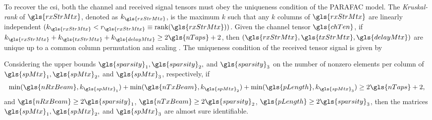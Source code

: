 \documentclass[conference]{IEEEtran}
\begin{document}
To recover the \gls{csi}, both the channel and
received signal tensors must obey the uniqueness condition of the
\gls{PARAFAC} model. The \textit{Kruskal-rank} of $\gls{rxStrMtx}$, denoted as
$k_{\gls{rxStrMtx}}$, is the maximum $k$ such that any $k$ columns of
$\gls{rxStrMtx}$ are linearly independent $(k_{\gls{rxStrMtx}} <
r_{\gls{rxStrMtx}} \equiv \textrm{rank}(\gls{rxStrMtx}) ) $. Given the channel
tensor $\gls{chTen}$, if
$k_{\gls{rxStrMtx}}+k_{\gls{txStrMtx}}+k_{\gls{delayMtx}} \geq 2\gls{nTaps} +
2$, then $(\gls{rxStrMtx},\gls{txStrMtx},\gls{delayMtx})$ are unique up to a
common column permutation and scaling \cite{Sidiropoulos:2000}. The uniqueness
condition of the received tensor signal is given by \cite{Sidiropoulos:2012}
\begin{theorem}
  \label{th.:compressed_parafac}
    Considering the upper bounds $\gls{sparsity}_1,\gls{sparsity}_2,$ and
    $\gls{sparsity}_3$ on the number of nonzero elements per column of
    $\gls{spMtx}_1, \gls{spMtx}_2,$ and $\gls{spMtx}_3$, respectively, if
    \begin{equation}
      \label{eq.uniqueness_compress_parafac}
      \min (\gls{nRxBeam},k_{\gls{spMtx}_1}) +\min (\gls{nTxBeam},k_{\gls{spMtx}_2}) + \min (\gls{pLength},k_{\gls{spMtx}_3}) \geq 2\gls{nTaps} + 2,
    \end{equation}
    and $\gls{nRxBeam} \geq 2 \gls{sparsity}_1$, $\gls{nTxBeam} \geq 2
    \gls{sparsity}_2$, $\gls{pLength} \geq 2 \gls{sparsity}_3$, then the
    matrices $\gls{spMtx}_1, \gls{spMtx}_2,$ and $\gls{spMtx}_3$ are almost sure identifiable.
\end{theorem}
\end{document}
